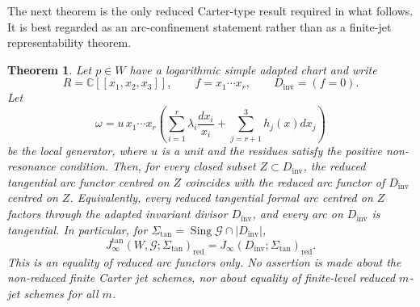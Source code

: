 \documentclass[11pt]{amsart}
\numberwithin{equation}{section}
\theoremstyle{plain}
\newtheorem{Theorem}{Theorem}[section]
\theoremstyle{definition}
\newcommand{\Sing}{\operatorname{Sing}}
\newcommand{\Sigmatan}{\Sigma_{\mathrm{tan}}}
\newcommand{\red}{\mathrm{red}}
\newcommand{\Dinv}{D_{\mathrm{inv}}}
\newcommand{\bC}{\mathbb C}
\newcommand{\cG}{\mathcal G}
\begin{document}
The next theorem is the only reduced Carter-type result required in what follows.  It is
best regarded as an arc-confinement statement rather than as a finite-jet
representability theorem.

\begin{Theorem} 
\label{thm:carter-representability}
Let $p\in W$ have a logarithmic simple adapted chart and write
\[
R=\bC[[x_1,x_2,x_3]],\qquad f=x_1\cdots x_r,
\qquad \Dinv=(f=0).
\]
Let
\[
\omega=
u\,x_1\cdots x_r
\left(
\sum_{i=1}^r \lambda_i\frac{dx_i}{x_i}
+
\sum_{j=r+1}^3 h_j(x)dx_j
\right)
\]
be the local generator, where $u$ is a unit and the residues satisfy the
positive non-resonance condition.  Then, for every closed subset
$Z\subset \Dinv$, the reduced tangential arc functor centred on $Z$
coincides with the reduced arc functor of $\Dinv$ centred on $Z$.
Equivalently, every reduced tangential formal arc centred on $Z$ factors
through the adapted invariant divisor $\Dinv$, and every arc on
$\Dinv$ is tangential.  In particular, for
$\Sigmatan=\Sing\cG\cap |\Dinv|$,
\[
J_\infty^{\tan}(W,\cG;\Sigmatan)_{\red}
=
J_\infty(\Dinv;\Sigmatan)_{\red}.
\]
This is an equality of reduced arc functors only.  No assertion is made about
the non-reduced finite Carter jet schemes, nor about equality of finite-level
reduced $m$-jet schemes for all $m$.
\end{Theorem}
\end{document}
